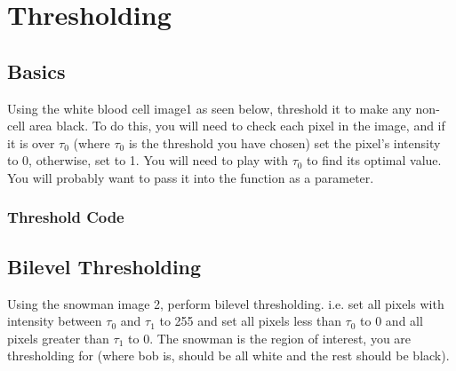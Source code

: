\documentclass[a4paper]{article}
\newcommand{\code}[2]{
 \vspace{1em}
 \subsubsection*{#1}
 
}
\begin{document}
\section{Thresholding}

\subsection{Basics} Using the white blood cell image1 as seen below, threshold it to make any
non-cell area black. To do this, you will need to check each pixel in the image,
and if it is over $\tau_0$ (where $\tau_0$ is the threshold you have chosen) set the pixel’s
intensity to 0, otherwise, set to 1. You will need to play with $\tau_0$ to find its
optimal value. You will probably want to pass it into the function as a
parameter.
\code{Threshold Code}{threshold-code.sci}
\subsection{Bilevel Thresholding}
Using the snowman image 2, perform bilevel thresholding. i.e. set all
pixels with intensity between $\tau_0$ and $\tau_1$ to 255 and set all pixels
less than $\tau_0$ 
to 0 and all pixels greater than $\tau_1$ to 0. The snowman is the region of interest,
you are thresholding for (where bob is, should be all white and the rest should
be black).
\end{document}
